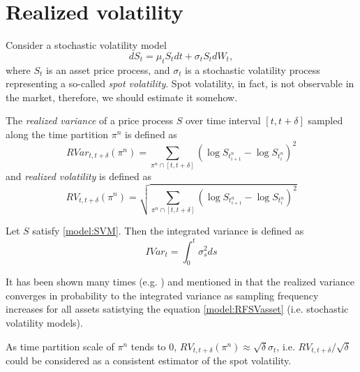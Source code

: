 \section{Realized volatility}
    Consider a stochastic volatility model 
    \begin{equation}\label{model:SVM}
        dS_t = \mu_t S_t dt + \sigma_t S_tdW_t,
    \end{equation}
    where $S_t$ is an asset price process, and $\sigma_t$ is a stochastic volatility process representing a so-called \emph{spot volatility}.
    Spot volatility, in fact, is not observable in the market, therefore, we should estimate it somehow.

    \begin{definition}
        The \emph{realized variance} of a price process $S$ over time interval $[t, t + \delta]$ sampled along the time partition $\pi^n$
        is defined as 
        \begin{equation}\label{def:RV}
            RVar_{t, t + \delta}(\pi^n) = \sum_{\pi^n \cap [t, t + \delta]} \left(\log S_{t^n_{i+1}} - \log S_{t^n_{i}}\right)^2
        \end{equation}
        and \emph{realized volatility} is defined as
        \begin{equation}\label{def:RVol}
            RV_{t, t + \delta}(\pi^n) = \sqrt{\sum_{\pi^n \cap [t, t + \delta]} \left(\log S_{t^n_{i+1}} - \log S_{t^n_{i}}\right)^2}
        \end{equation}
    \end{definition}

    \begin{definition}
        Let $S$ satisfy \eqref{model:SVM}. Then the integrated variance is defined as
        \begin{equation}\label{def:IV}
            IVar_t = \int_{0}^{t} \sigma_s^2 ds
        \end{equation}
    \end{definition}
    It has been shown many times (e.g. \cite{Barndorff-Nielsen2002}) and mentioned in \cite{Cont2022} that the realized variance converges 
    in probability to the integrated variance as sampling frequency increases for all assets satistying the equation 
    \eqref{model:RFSVasset} (i.e. stochastic volatility models).
    \begin{proposition} 
        As time partition scale of $\pi^n$ tends to $0$, $RV_{t, t + \delta}(\pi^n) \approx \sqrt{\delta} \sigma_t$, i.e. $RV_{t, t + \delta}/\sqrt{\delta}$ could be considered as a consistent estimator of the spot volatility.
    \end{proposition}

